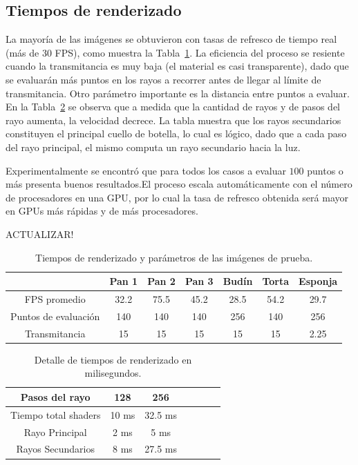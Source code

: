 \documentclass[spanish,a4paper,11pt,oneside,links]{report}
\begin{document}
\subsection{Tiempos de renderizado}

La mayoría de las imágenes se obtuvieron con tasas de refresco de tiempo real (más de 30 FPS), como muestra la Tabla~\ref{tab:n1}. La eficiencia del proceso se resiente cuando la transmitancia es muy baja (el material es casi transparente), dado que se evaluarán más puntos en los rayos a recorrer antes de llegar al límite de transmitancia. Otro parámetro importante es la distancia entre puntos a evaluar. En la Tabla~\ref{tab:n2} se observa que a medida que la cantidad de rayos y de pasos del rayo aumenta, la velocidad decrece. La tabla muestra que los rayos secundarios constituyen el principal cuello de botella, lo cual es lógico, dado que a cada paso del rayo principal, el mismo computa un rayo secundario hacia la luz.

Experimentalmente se encontró que para todos los casos a evaluar $100$ puntos o más presenta buenos resultados.El proceso escala automáticamente con el número de procesadores en una GPU, por lo cual la tasa de refresco obtenida será mayor en GPUs más rápidas y de más procesadores.


ACTUALIZAR!
\begin{table}[htb]
\centering
\begin{tabular}{|c|c|c|c|c|c|c|}
\hline &  Pan 1 & Pan 2 & Pan 3 & Budín & Torta & Esponja \\
\hline
\hline
 FPS promedio  & 32.2 &  75.5 &  45.2 & 28.5 &  54.2 & 29.7\\
\hline
 Puntos de evaluación &  140 &  140 &  140 & 256 &  140 & 256 \\
\hline
 Transmitancia &  15 &  15 &  15 & 15 &  15 & 2.25 \\
\hline
\end{tabular}
\caption{Tiempos de renderizado y parámetros de las imágenes de prueba.}
\label{tab:n1}
\end{table}

\begin{table}[htb]
\centering
\begin{tabular}{|c|c|c|c|c|c|c|}
\hline
 Pasos del rayo         & 128 &  256 \\
\hline
\hline
 Tiempo total shaders   & 10 ms &  32.5 ms \\
\hline
 Rayo Principal         & 2 ms  & 5 ms  \\
\hline
 Rayos Secundarios      &  8 ms & 27.5 ms  \\
\hline
\end{tabular}
\caption{Detalle de tiempos de renderizado en milisegundos.}
\label{tab:n2}
\end{table}
\end{document}
